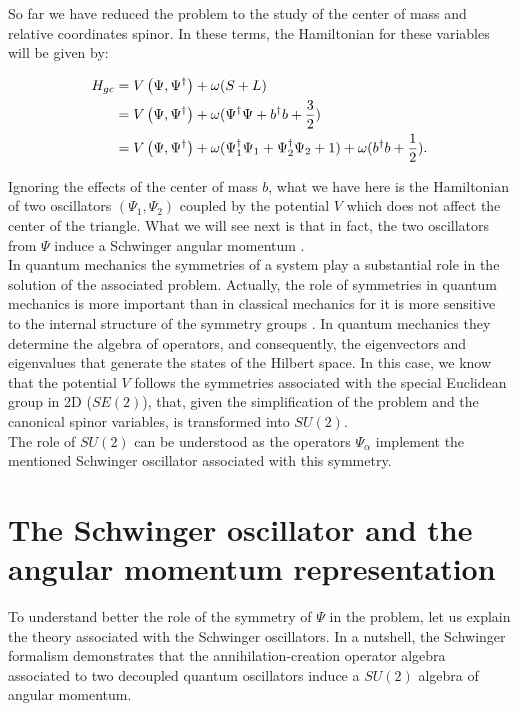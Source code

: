 
So far we have reduced the problem to the study of the center of mass and relative coordinates spinor. In these terms, the Hamiltonian for these variables will be given by:

\begin{align*}
H_{gc} &= V\left( \Psi,\Psi^\dagger \right)+ \omega (S+L)\\
&= V\left( \Psi,\Psi^\dagger \right) + \omega(\Psi^\dagger\Psi + b^\dagger b +\frac{3}{2})\\
&= V\left( \Psi,\Psi^\dagger \right) + \omega(\Psi_1^\dagger\Psi_1 +\Psi_2^\dagger\Psi_2+ 1) +\omega(b^\dagger b +\frac{1}{2}).
\end{align*}

Ignoring the effects of the center of mass $b$, what we have here is the Hamiltonian of two oscillators $(\Psi_1,\Psi_2)$ coupled by the potential $V$ which does not affect the center of the triangle. What we will see next is that in fact, the two oscillators from $\Psi$ induce a Schwinger angular momentum \cite{Schwinger}.\\

In quantum mechanics the symmetries of a system play a substantial role in the solution of the associated problem. Actually, the role of symmetries in quantum mechanics is more important than in classical mechanics for it is more sensitive to the internal structure of the symmetry groups \cite{qfhebook}. In quantum mechanics they determine the algebra of operators, and consequently, the eigenvectors and eigenvalues that generate the states of the Hilbert space. In this case, we know that the potential $V$ follows the symmetries associated with the special Euclidean group in 2D ($SE(2)$), that, given the simplification of the problem and the canonical spinor variables, is transformed into $SU(2)$.\\

The role of $SU(2)$ can be understood as the operators $\Psi_\alpha$ implement the mentioned Schwinger oscillator \cite{Schwinger} associated with this symmetry.\\

\section{The Schwinger oscillator and the angular momentum representation}
To understand better the role of the symmetry of $\Psi$ in the problem, let us explain the theory associated with the Schwinger oscillators. In a nutshell, the Schwinger formalism demonstrates that the annihilation-creation operator algebra associated to two decoupled quantum oscillators induce a $SU(2)$ algebra of angular momentum.\\

